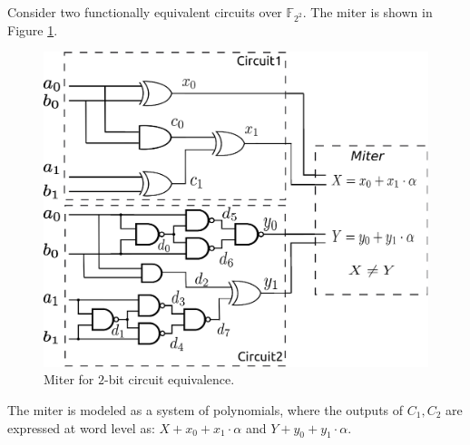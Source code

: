 \begin{Example}\label{exp:miter}
Consider two functionally equivalent circuits 
over $\mathbb{F}_{2^2}$. The miter is shown in Figure
\ref{fig:2bitadder}. 
	\begin{figure}[htb]
		\centerline{
		\includegraphics[scale=0.35]{./figures/2bitadder.eps}
		}
		\caption{Miter for $2$-bit circuit equivalence.}
		\label{fig:2bitadder}
	\end{figure}

The miter is modeled as a system of polynomials, where the outputs of
$C_1, C_2$ are expressed at word level as: $X+x_{0}+x_{1}\cdot \alpha$ and
$Y+y_{0}+y_{1}\cdot \alpha$. 


\end{Example}

